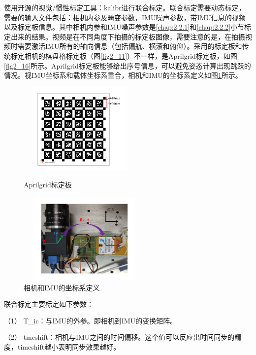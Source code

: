 使用开源的视觉/惯性标定工具：kalibr进行联合标定。联合标定需要动态标定，需要的输入文件包括：相机内参及畸变参数，IMU噪声参数，带IMU信息的视频以及标定板信息。其中相机内参和IMU噪声参数是\ref{chap:2.2.1}和\ref{chap:2.2.2}小节标定出来的结果。视频是在不同角度下拍摄的标定板图像，需要注意的是，在拍摄视频时需要激活IMU所有的轴向信息（包括偏航、横滚和俯仰）。采用的标定板和传统标定相机的棋盘格标定板（图\ref{fig2_11}）不一样，是Aprilgrid标定板，如图\ref{fig2_16}所示。Aprilgrid标定板能够给出序号信息，可以避免姿态计算出现跳跃的情况。视IMU坐标系和载体坐标系重合，相机和IMU的坐标系定义如图\ref{fig2_17}所示。
\begin{figure}[h]\setlength{\belowcaptionskip}{-12pt}
	\centering	
	\begin{minipage}[t]{0.35\linewidth}				
		\includegraphics[height=4.5cm,width=6cm]{figures/chapter2/fig2_16}		
		\caption{Aprilgrid标定板}	\label{fig2_16}	
	\end{minipage}%
	\hspace{0.1in}	
	\begin{minipage}[t]{0.5\linewidth}		
		\centering		
		\includegraphics[height=4.5cm,width=6.5cm]{figures/chapter2/fig2_17}		
		\caption{相机和IMU的坐标系定义} \label{fig2_17}		
	\end{minipage}	
\end{figure} 

联合标定主要标定如下参数：

（1）  T\_ic：与IMU的外参。即相机到IMU的变换矩阵。

（2）  tmeshift：相机与IMU之间的时间偏移。这个值可以反应出时间同步的精度，timeshift越小表明同步效果越好。

